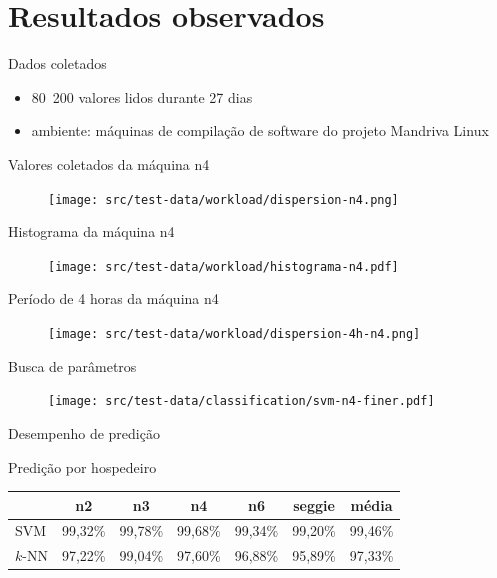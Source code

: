 \documentclass{beamer}
\begin{document}
\section{Resultados observados}

\begin{frame}{Dados coletados}
\begin{itemize}
  \item 80~200 valores lidos durante 27 dias
  \item ambiente: máquinas de compilação de software do projeto Mandriva Linux
\end{itemize}
\end{frame}

\begin{frame}{Valores coletados da máquina n4}
\begin{figure}
\centering
\texttt{[image: src/test-data/workload/dispersion-n4.png]}
\end{figure}
\end{frame}

\begin{frame}{Histograma da máquina n4}
\begin{figure}
\centering
\texttt{[image: src/test-data/workload/histograma-n4.pdf]}
\end{figure}
\end{frame}

\begin{frame}{Período de 4 horas da máquina n4}
\begin{figure}
\centering
\texttt{[image: src/test-data/workload/dispersion-4h-n4.png]}
\end{figure}
\end{frame}

\begin{frame}{Busca de parâmetros}
\begin{figure}
\centering
\texttt{[image: src/test-data/classification/svm-n4-finer.pdf]}
\end{figure}
\end{frame}

\begin{frame}{Desempenho de predição}
\begin{block}{Predição por hospedeiro}
\begin{table}
\centering
\begin{tabular}{| l | c | c | c | c | c | c |}
\hline
		& n2      & n3       & n4      	 & n6        & seggie  	 & média   \\
\hline
SVM     	& 99,32\%  & 99,78\% &   99,68\% &   99,34\% &   99,20\% & 99,46\% \\
\hline
$k$-NN  	& 97,22\%  & 99,04\% &   97,60\% &   96,88\% &   95,89\% & 97,33\% \\
\hline
\end{tabular}
\end{table}
\end{block}
\end{frame}
\end{document}
